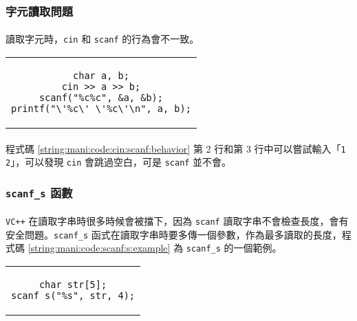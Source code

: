 \documentclass[12pt,a4paper,oneside]{report}
\begin{document}
\begin{CJK}{UTF8}{bkai}
\subsubsection{字元讀取問題}

\paragraph{}讀取字元時，\lstinline!cin! 和 \lstinline!scanf! 的行為會不一致。

\begin{code}[h!]
  \centering
  \begin{tabular}{c}
  \begin{lstlisting}
char a, b;
cin >> a >> b;
scanf("%c%c", &a, &b);
printf("\'%c\' \'%c\'\n", a, b);
  \end{lstlisting}
  \end{tabular}
  \caption{\lstinline!cin! 和 \lstinline!scanf! 行為不一致}
  \label{string:mani:code:cin:scanf:behavior}
\end{code}

\paragraph{}程式碼 \ref{string:mani:code:cin:scanf:behavior} 第 2 行和第 3 行中可以嘗試輸入「\lstinline!1 2!」，可以發現 \lstinline!cin! 會跳過空白，可是 \lstinline!scanf! 並不會。

\subsubsection{\lstinline!scanf_s! 函數}

\paragraph{}\texttt{VC++} 在讀取字串時很多時候會被擋下，因為 \lstinline!scanf! 讀取字串不會檢查長度，會有安全問題。\lstinline!scanf_s! 函式在讀取字串時要多傳一個參數，作為最多讀取的長度，程式碼 \ref{string:mani:code:scanf:s:example} 為 \lstinline!scanf_s! 的一個範例。

\begin{code}[h!]
  \centering
  \begin{tabular}{c}
  \begin{lstlisting}
char str[5];
scanf_s("%s", str, 4);
  \end{lstlisting}
  \end{tabular}
  \caption{\lstinline!scanf_s! 的範例}
  \label{string:mani:code:scanf:s:example}
\end{code}


\end{CJK}
\end{document}
